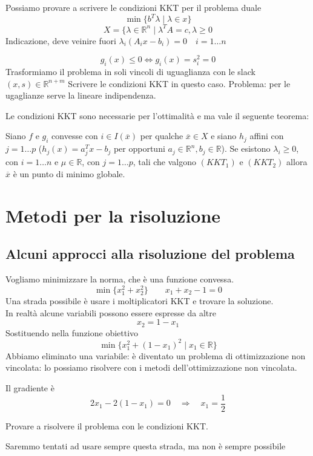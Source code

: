 \begin{exercise}
  Possiamo provare a scrivere le condizioni KKT per il problema
  duale
  $$ \min \{ b^{T}\lambda \; | \; \lambda \in x \} $$
  $$ X = \{ \lambda \in \mathbb{R}^{n} \; | \; \lambda^{T}A = c,
  \lambda \geq 0 $$
Indicazione, deve veinire fuori $\lambda_i(A_ix - b_i) = 0 \quad
i=1 \ldots n$
\end{exercise}
\begin{exercise}
 $$g_i(x) \leq 0
\Longleftrightarrow g_i(x) = s_i^{2} = 0
 $$
Trasformiamo il problema in soli vincoli di uguaglianza con le slack
$(x,s) \in \mathbb{R}^{n+m} $
Scrivere le condizioni KKT in questo caso.
Problema: per le ugaglianze serve la lineare indipendenza.
\end{exercise}
Le condizioni KKT sono necessarie per l'ottimalit\`a e
ma vale il seguente teorema:
\begin{theo}
Siano $f$ e $g_i$ convesse con $i \in I(\overline{x})$ per
qualche $\overline{x} \in X$ e siano
$h_j$ affini con $j=1\ldots p$ ($h_j(x) = a_j^{T}x- b_j$
per opportuni $a_j \in \mathbb{R}^{n}, b_j \in \mathbb{R}$).
Se esistono $\lambda_i \geq 0$, con $i=1\ldots n$ e
$\mu \in \mathbb{R}$, con $j=1\ldots p$, tali che
valgono $(KKT_1)$ e $(KKT_2)$ allora $\overline{x}$
\`e un punto di minimo globale.
\end{theo}

\section{Metodi per la risoluzione}
\subsection{Alcuni approcci alla risoluzione del problema}
\begin{example}
Vogliamo minimizzare la norma, che \`e una funzione convessa.
  $$ \min \{ x_1^{2} + x_2^{2} \} \qquad x_1 + x_2 -1 = 0$$
Una strada possibile \`e usare i moltiplicatori KKT e trovare
la soluzione. \\
In realt\`a alcune variabili possono essere espresse da altre
$$ x_2 = 1 - x_1 $$
Sostituendo nella funzione obiettivo
$$ \min \{ x_1^{2} + (1-x_1)^{2} \; | \; x_1 \in \mathbb{R} \} $$
Abbiamo eliminato una variabile: \`e diventato un problema
di ottimizzazione non vincolata: lo possiamo risolvere con
i metodi dell'ottimizzazione non vincolata.

Il gradiente \`e
$$ 2x_1 - 2(1 -x_1) = 0 \quad \Rightarrow \quad x_1 = \frac{1}{2}$$
\end{example}
\begin{exercise}
 Provare a risolvere il problema con le condizioni KKT.
\end{exercise}
Saremmo tentati ad usare sempre questa strada, ma non \`e sempre possibile

